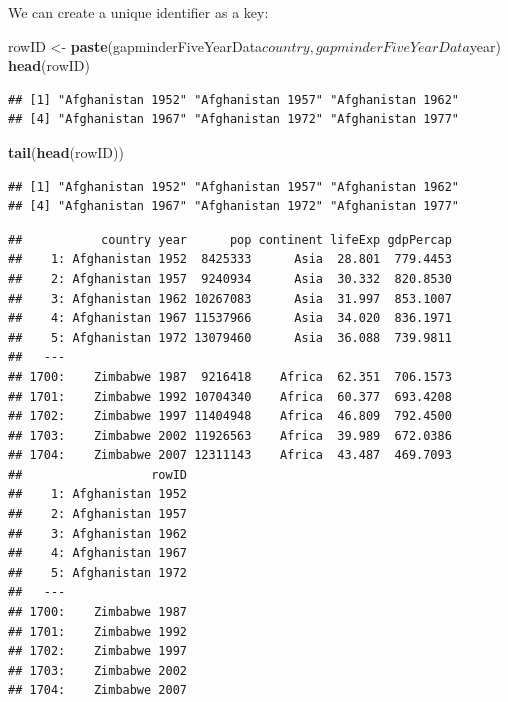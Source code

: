 \documentclass[]{article}
\newenvironment{Shaded}{\begin{snugshade}}{\end{snugshade}}
\newcommand{\KeywordTok}[1]{\textcolor[rgb]{0.13,0.29,0.53}{\textbf{{#1}}}}
\newcommand{\StringTok}[1]{\textcolor[rgb]{0.31,0.60,0.02}{{#1}}}
\newcommand{\NormalTok}[1]{{#1}}
\begin{document}
We can create a unique identifier as a key:

\begin{Shaded}
\begin{Highlighting}[]
\NormalTok{rowID <-}\StringTok{ }\KeywordTok{paste}\NormalTok{(gapminderFiveYearData$country, gapminderFiveYearData$year)}
\KeywordTok{head}\NormalTok{(rowID)}
\end{Highlighting}
\end{Shaded}

\begin{verbatim}
## [1] "Afghanistan 1952" "Afghanistan 1957" "Afghanistan 1962"
## [4] "Afghanistan 1967" "Afghanistan 1972" "Afghanistan 1977"
\end{verbatim}

\begin{Shaded}
\begin{Highlighting}[]
\KeywordTok{tail}\NormalTok{(}\KeywordTok{head}\NormalTok{(rowID))}
\end{Highlighting}
\end{Shaded}

\begin{verbatim}
## [1] "Afghanistan 1952" "Afghanistan 1957" "Afghanistan 1962"
## [4] "Afghanistan 1967" "Afghanistan 1972" "Afghanistan 1977"
\end{verbatim}

\begin{Shaded}
\end{Shaded}

\begin{verbatim}
##           country year      pop continent lifeExp gdpPercap
##    1: Afghanistan 1952  8425333      Asia  28.801  779.4453
##    2: Afghanistan 1957  9240934      Asia  30.332  820.8530
##    3: Afghanistan 1962 10267083      Asia  31.997  853.1007
##    4: Afghanistan 1967 11537966      Asia  34.020  836.1971
##    5: Afghanistan 1972 13079460      Asia  36.088  739.9811
##   ---                                                      
## 1700:    Zimbabwe 1987  9216418    Africa  62.351  706.1573
## 1701:    Zimbabwe 1992 10704340    Africa  60.377  693.4208
## 1702:    Zimbabwe 1997 11404948    Africa  46.809  792.4500
## 1703:    Zimbabwe 2002 11926563    Africa  39.989  672.0386
## 1704:    Zimbabwe 2007 12311143    Africa  43.487  469.7093
##                  rowID
##    1: Afghanistan 1952
##    2: Afghanistan 1957
##    3: Afghanistan 1962
##    4: Afghanistan 1967
##    5: Afghanistan 1972
##   ---                 
## 1700:    Zimbabwe 1987
## 1701:    Zimbabwe 1992
## 1702:    Zimbabwe 1997
## 1703:    Zimbabwe 2002
## 1704:    Zimbabwe 2007
\end{verbatim}
\end{document}
